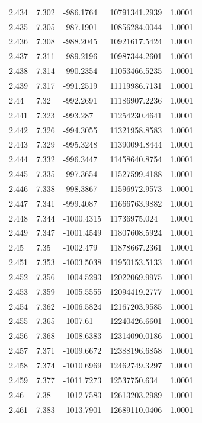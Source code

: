 \begin{tabular}{lllll}
2.434 & 7.302 & -986.1764 & 10791341.2939 & 1.0001 \\
2.435 & 7.305 & -987.1901 & 10856284.0044 & 1.0001 \\
2.436 & 7.308 & -988.2045 & 10921617.5424 & 1.0001 \\
2.437 & 7.311 & -989.2196 & 10987344.2601 & 1.0001 \\
2.438 & 7.314 & -990.2354 & 11053466.5235 & 1.0001 \\
2.439 & 7.317 & -991.2519 & 11119986.7131 & 1.0001 \\
2.44 & 7.32 & -992.2691 & 11186907.2236 & 1.0001 \\
2.441 & 7.323 & -993.287 & 11254230.4641 & 1.0001 \\
2.442 & 7.326 & -994.3055 & 11321958.8583 & 1.0001 \\
2.443 & 7.329 & -995.3248 & 11390094.8444 & 1.0001 \\
2.444 & 7.332 & -996.3447 & 11458640.8754 & 1.0001 \\
2.445 & 7.335 & -997.3654 & 11527599.4188 & 1.0001 \\
2.446 & 7.338 & -998.3867 & 11596972.9573 & 1.0001 \\
2.447 & 7.341 & -999.4087 & 11666763.9882 & 1.0001 \\
2.448 & 7.344 & -1000.4315 & 11736975.024 & 1.0001 \\
2.449 & 7.347 & -1001.4549 & 11807608.5924 & 1.0001 \\
2.45 & 7.35 & -1002.479 & 11878667.2361 & 1.0001 \\
2.451 & 7.353 & -1003.5038 & 11950153.5133 & 1.0001 \\
2.452 & 7.356 & -1004.5293 & 12022069.9975 & 1.0001 \\
2.453 & 7.359 & -1005.5555 & 12094419.2777 & 1.0001 \\
2.454 & 7.362 & -1006.5824 & 12167203.9585 & 1.0001 \\
2.455 & 7.365 & -1007.61 & 12240426.6601 & 1.0001 \\
2.456 & 7.368 & -1008.6383 & 12314090.0186 & 1.0001 \\
2.457 & 7.371 & -1009.6672 & 12388196.6858 & 1.0001 \\
2.458 & 7.374 & -1010.6969 & 12462749.3297 & 1.0001 \\
2.459 & 7.377 & -1011.7273 & 12537750.634 & 1.0001 \\
2.46 & 7.38 & -1012.7583 & 12613203.2989 & 1.0001 \\
2.461 & 7.383 & -1013.7901 & 12689110.0406 & 1.0001 \\

\end{tabular}
